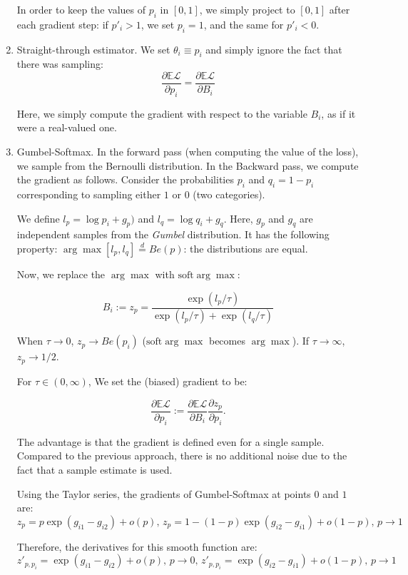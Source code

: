 \documentclass[a4paper,11pt,oneside]{report}
\begin{document}
\begin{enumerate}
    In order to keep the values of $p_i$ in $[0,1]$, we simply project to $[0,1]$ after each gradient step: if $p'_i>1$, we set $p_i=1$, and the same for $p'_i<0$.

    \item Straight-through estimator. We set $\theta_i\equiv p_i$ and simply ignore the fact that there was sampling:
    $$
    \frac{\partial \mathbb E \mathcal L}{\partial p_i}=\frac{\partial \mathbb E \mathcal L}{\partial B_i}
    $$

    Here, we simply compute the gradient with respect to the variable $B_i$, as if it were a real-valued one.
    \item Gumbel-Softmax. In the forward pass (when computing the value of the loss), we sample from the Bernoulli distribution. In the Backward pass, we compute the gradient as follows. Consider the probabilities $p_i$ and $q_i=1-p_i$ corresponding to sampling either $1$ or $0$ (two categories).

    We define $l_p=\log p_i+g_p)$ and $l_q=\log q_i+g_q$. Here, $g_p$ and $g_q$ are independent samples from the {\em Gumbel} distribution. It has the following property: $\arg\max [l_p, l_q]\overset{d}{=}Be(p)$: the distributions are equal.

    Now, we replace the $\arg\max$ with $\mbox{soft}\arg\max$:

    $$
    B_i:=z_p=\frac{\exp(l_p/\tau)}{\exp(l_p/\tau)+\exp(l_q/\tau)}
    $$

    When $\tau\to 0$, $z_p\to Be(p_i)$ ($\mbox{soft}\arg\max$ becomes $\arg\max$). If $\tau\to\infty$, $z_p\to1/2$.

    For $\tau\in(0,\infty)$, We set the (biased) gradient to be:

    $$
    \frac{\partial \mathbb E\mathcal L}{\partial p_i}:=\frac{\partial \mathbb E \mathcal L}{\partial B_i}\frac{\partial z_p}{\partial p_i}.
    $$

    The advantage is that the gradient is defined even for a single sample. Compared to the previous approach, there is no additional noise due to the fact that a sample estimate is used.


    Using the Taylor series, the gradients of Gumbel-Softmax at points $0$ and $1$ are:
    $$
    z_p=p\exp(g_{i1}-g_{i2})+o(p),\,
    z_p=1-(1-p)\exp(g_{i2}-g_{i1})+o(1-p),\,p\to 1
    $$

    Therefore, the derivatives for this smooth function are:
    $$
    z'_{p,p_i}=\exp(g_{i1}-g_{i2})+o(p),\,p\to 0,\,z'_{p,p_i}=\exp(g_{i2}-g_{i1})+o(1-p),\,p\to 1
    $$


\end{enumerate}
\end{document}
